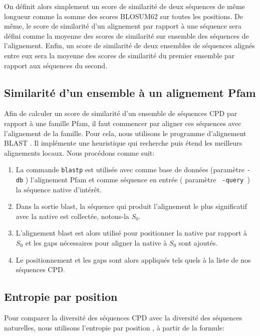 On définit alors simplement un score de similarité de deux séquences de même longueur comme la somme des scores BLOSUM62 sur toutes les positions. De même, le score de similarité d'un alignement par rapport à une séquence sera défini comme la moyenne des scores de similarité sur ensemble des séquences de l'alignement. Enfin, un score de similarité de deux ensembles de séquences alignés entre eux sera la moyenne des scores de similarité du premier ensemble par rapport aux séquences du second.  

\subsection{Similarité d'un ensemble à un alignement Pfam}
\label{SimPfam}
Afin de calculer un score de similarité d'un ensemble de séquences CPD par rapport à une famille Pfam, il faut commencer par aligner ces séquences avec l'alignement de la famille. Pour cela, nous utilisons le programme d'alignement BLAST \cite{Altschul97,Camacho08}. Il implémente une heuristique qui recherche puis étend les meilleurs alignements locaux. Nous procédons comme suit:
\begin{enumerate}[leftmargin=*]
\item La commande \verb!blastp! est utilisée avec comme base de données (paramètre \verb!-db! ) l'alignement Pfam et comme séquence en entrée ( paramètre \verb! -query !) la séquence native d'intérêt. 
\item Dans la sortie blast, la séquence qui produit l'alignement le plus significatif avec la native est collectée, notons-la $S_0$. 
\item L'alignement blast est alors utilisé pour positionner la native par rapport à $S_0$ et les gaps nécessaires pour aligner la native à $S_0$ sont ajoutés.
\item Le positionnement et les gaps sont alors appliqués tels quels à la liste de nos séquences CPD.

\end{enumerate}

\subsection{Entropie par position}
\label{subsection:Entropie}
Pour comparer la diversité des séquences CPD avec la diversité des séquences naturelles, nous utilisons l'entropie par position \cite{DurbinBK}, à partir de la formule:

